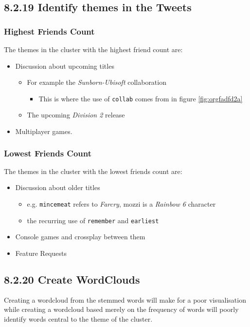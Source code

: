 \documentclass[11pt]{article}
\begin{document}
\subsection{8.2.19 Identify themes in the Tweets}
\label{sec:org582bd88}
\subsubsection{Highest Friends Count}
\label{sec:org763dba2}
The themes in the cluster with the highest friend count are:

\begin{itemize}
\item Discussion about upcoming titles
\begin{itemize}
\item For example the \emph{Sunborn-Ubisoft} collaboration
\begin{itemize}
\item This is where the use of \texttt{collab} comes from in figure \ref{fig:orgfadfd2a}
\end{itemize}
\item The upcoming \emph{Division 2} release
\end{itemize}
\item Multiplayer games.
\end{itemize}
\subsubsection{Lowest Friends Count}
\label{sec:org9356677}

The themes in the cluster with the lowest friends count are:

\begin{itemize}
\item Discussion about older titles
\begin{itemize}
\item e.g. \texttt{mincemeat} refers to \emph{Farcry}, mozzi is a \emph{Rainbow 6} character
\item the recurring use of \texttt{remember} and \texttt{earliest}
\end{itemize}
\item Console games and crossplay between them
\item Feature Requests
\end{itemize}

\subsection{8.2.20 Create WordClouds}
\label{sec:org47957ab}
Creating a wordcloud from the stemmed words will make for a poor visualisation
while creating a wordcloud based merely on the frequency of words will poorly
identify words central to the theme of the cluster.
\end{document}
